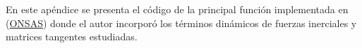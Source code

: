 \chapter{}\label{Ape1}

En este apéndice se presenta el código de la principal función implementada en (\href{https://github.com/ONSAS/ONSAS.m/}{ONSAS}) donde el autor incorporó los términos dinámicos de fuerzas inerciales y matrices tangentes estudiadas.

%
